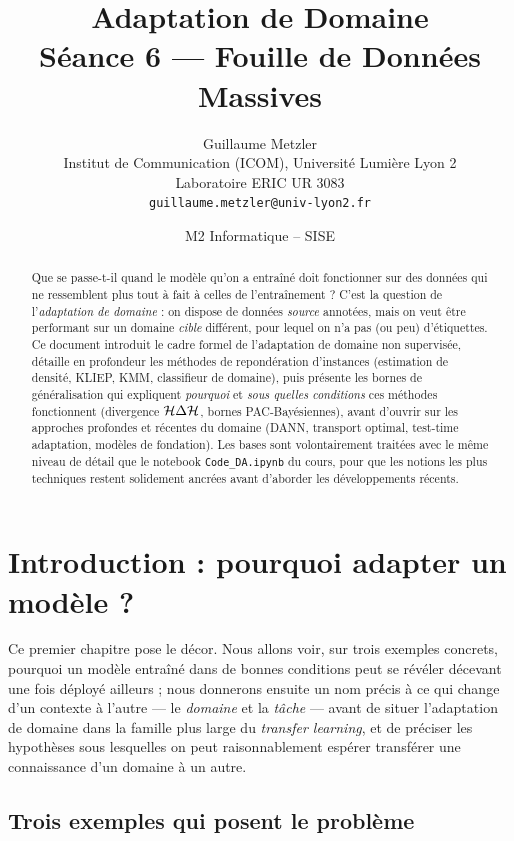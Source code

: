 \documentclass[11pt]{article}
\title{\vspace{-1.5cm}\textbf{Adaptation de Domaine}\\[0.1cm]\Large Séance 6 --- Fouille de Données Massives}
\author{Guillaume Metzler\\[0.1cm]\small Institut de Communication (ICOM), Université Lumière Lyon 2\\ \small Laboratoire ERIC UR 3083\\[0.1cm]\small\texttt{guillaume.metzler@univ-lyon2.fr}}
\date{M2 Informatique -- SISE}
\begin{document}
\maketitle
\thispagestyle{plain}

\begin{abstract}
\noindent Que se passe-t-il quand le modèle qu'on a entraîné doit fonctionner sur des données qui ne
ressemblent plus tout à fait à celles de l'entraînement ? C'est la question de l'\emph{adaptation de
domaine} : on dispose de données \emph{source} annotées, mais on veut être performant sur un domaine
\emph{cible} différent, pour lequel on n'a pas (ou peu) d'étiquettes. Ce document introduit le cadre
formel de l'adaptation de domaine non supervisée, détaille en profondeur les méthodes de repondération
d'instances (estimation de densité, KLIEP, KMM, classifieur de domaine), puis présente les bornes de
généralisation qui expliquent \emph{pourquoi} et \emph{sous quelles conditions} ces méthodes fonctionnent
(divergence $\mathcal{H}\Delta\mathcal{H}$, bornes PAC-Bayésiennes), avant d'ouvrir sur les approches profondes et
récentes du domaine (DANN, transport optimal, test-time adaptation, modèles de fondation). Les bases sont
volontairement traitées avec le même niveau de détail que le notebook \texttt{Code\_DA.ipynb} du cours,
pour que les notions les plus techniques restent solidement ancrées avant d'aborder les développements
récents.
\end{abstract}

\tableofcontents

\section{Introduction : pourquoi adapter un modèle ?}

Ce premier chapitre pose le décor. Nous allons voir, sur trois exemples concrets, pourquoi un modèle
entraîné dans de bonnes conditions peut se révéler décevant une fois déployé ailleurs ; nous donnerons
ensuite un nom précis à ce qui change d'un contexte à l'autre --- le \emph{domaine} et la \emph{tâche}
--- avant de situer l'adaptation de domaine dans la famille plus large du \emph{transfer learning}, et
de préciser les hypothèses sous lesquelles on peut raisonnablement espérer transférer une connaissance
d'un domaine à un autre.

\subsection{Trois exemples qui posent le problème}
\end{document}

